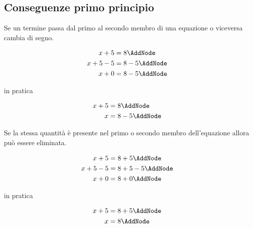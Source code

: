 \subsection{Conseguenze primo principio}
Se un termine passa  dal primo al secondo membro di una equazione o viceversa cambia di segno.
\begin{esempio}
\begin{NodesList}[dy=5pt,margin=3cm]
 \[ %
 \begin{aligned}
 x+5 &= 8 \AddNode\\
 x +5-5 &= 8-5 \AddNode\\
 x + 0 &= 8-5 \AddNode
 \end{aligned}
 \]
 \end{NodesList}
 in pratica
 \begin{NodesList}[dy=5pt,margin=3cm]
  \[ %
  \begin{aligned}
  x+5 &= 8 \AddNode\\
  x  &= 8-5 \AddNode
  \end{aligned}
  \]
  \end{NodesList}
\end{esempio}
Se la stessa quantità è presente nel primo o secondo membro dell'equazione allora può essere eliminata.
\begin{esempio}
\begin{NodesList}[dy=5pt,margin=3cm]
 \[ %
 \begin{aligned}
 x+5 &= 8+5 \AddNode\\
 x +5-5 &= 8+5-5 \AddNode\\
 x + 0 &= 8+0 \AddNode
 \end{aligned}
 \]
 \end{NodesList}
 in pratica
 \begin{NodesList}[dy=5pt,margin=3cm]
  \[ %
  \begin{aligned}
  x+5 &= 8+5 \AddNode\\
  x  &= 8 \AddNode
  \end{aligned}
  \]
  \end{NodesList}
\end{esempio}
